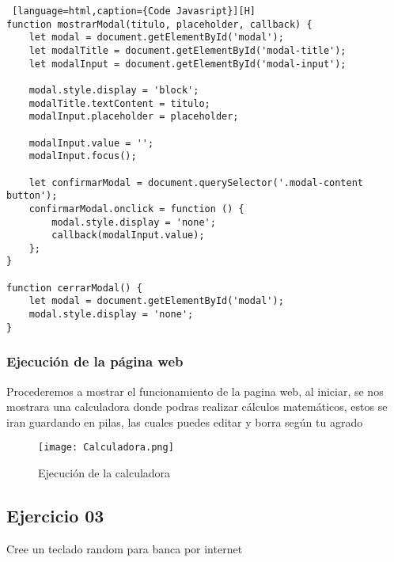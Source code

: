 \documentclass[14pt]{article}
\begin{document}
\begin{lstlisting} [language=html,caption={Code Javasript}][H]
function mostrarModal(titulo, placeholder, callback) {
    let modal = document.getElementById('modal');
    let modalTitle = document.getElementById('modal-title');
    let modalInput = document.getElementById('modal-input');

    modal.style.display = 'block';
    modalTitle.textContent = titulo;
    modalInput.placeholder = placeholder;

    modalInput.value = '';
    modalInput.focus();

    let confirmarModal = document.querySelector('.modal-content button');
    confirmarModal.onclick = function () {
        modal.style.display = 'none';
        callback(modalInput.value);
    };
}

function cerrarModal() {
    let modal = document.getElementById('modal');
    modal.style.display = 'none';
}
    \end{lstlisting}

    \subsubsection{Ejecución de la página web}
    Procederemos a mostrar el funcionamiento de la pagina web, al iniciar, se nos mostrara una calculadora donde podras realizar cálculos matemáticos, estos se iran guardando en pilas, las cuales puedes editar y borra según tu agrado
    
    \begin{figure}[H]
    \centering
    \texttt{[image: Calculadora.png]}
    \caption{Ejecución de la calculadora} %
    \label{fig:imagen} 
    \end{figure}

    \subsection{Ejercicio 03}
    Cree un teclado random para banca por internet
\end{document}
